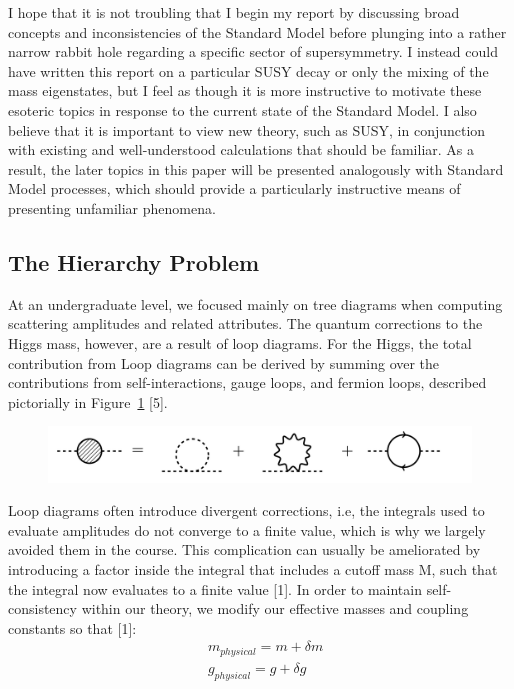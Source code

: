 \documentclass{article}
\begin{document}
\par
I hope that it is not troubling that I begin my report by discussing broad concepts and inconsistencies of the Standard Model before plunging into a rather narrow rabbit hole regarding a specific sector of supersymmetry. I instead could have written this report on a particular SUSY decay or only the mixing of the mass eigenstates, but I feel as though it is more instructive to motivate these esoteric topics in response to the current state of the Standard Model. I also believe that it is important to view new theory, such as SUSY, in conjunction with existing and well-understood calculations that should be familiar. As a result, the later topics in this paper will be presented analogously with Standard Model processes, which should provide a particularly instructive means of presenting unfamiliar phenomena.
\subsection{The Hierarchy Problem}
At an undergraduate level, we focused mainly on tree diagrams when computing scattering amplitudes and related attributes. The quantum corrections to the Higgs mass, however, are a result of loop diagrams. For the Higgs, the total contribution from Loop diagrams can be derived by summing over the contributions from self-interactions, gauge loops, and fermion loops, described pictorially in Figure~\ref{fig:1} [5]. 
\begin{figure}[H]
    \centering
    \caption{} 
    \includegraphics[width=12cm]{Loops.png}
    \label{fig:1}
\end{figure}
\par
Loop diagrams often introduce divergent corrections, i.e, the integrals used to evaluate amplitudes do not converge to a finite value, which is why we largely avoided them in the course. This complication can usually be ameliorated by introducing a factor inside the integral that includes a cutoff mass M, such that the integral now evaluates to a finite value [1]. In order to maintain self-consistency within our theory, we modify our effective masses and coupling constants so that [1]:
\begin{equation}\label{eq:3}
    \begin{aligned}    
    & m_{physical} = m + {\delta}m \\
    & g_{physical} = g + {\delta}g
    \end{aligned}
\end{equation}
\end{document}
